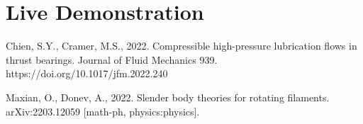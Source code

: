 \documentclass[11pt,letterpaper]{article}
\begin{document}
\section{Live Demonstration}
\cite{ChienCramer_22, MaxianDonev_22}

Chien, S.Y., Cramer, M.S., 2022. Compressible high-pressure lubrication flows in thrust bearings. Journal of Fluid Mechanics 939. https://doi.org/10.1017/jfm.2022.240

Maxian, O., Donev, A., 2022. Slender body theories for rotating filaments. arXiv:2203.12059 [math-ph, physics:physics].




\vfill
\printbibliography
\end{document}
